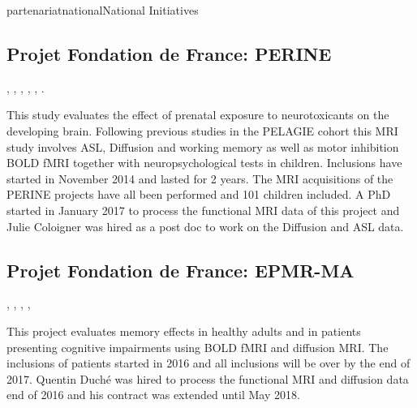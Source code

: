 \documentclass{ra2018}
\begin{document}
\begin{module}{partenariat}{national}{National Initiatives}

        \subsection{Projet Fondation de France: PERINE}
    \begin{participants}
      , 
      , 
      , 
      , 
      ,
      .
    \end{participants}
    This study evaluates the effect of prenatal exposure to neurotoxicants on the
    developing brain. Following previous studies in the PELAGIE cohort this MRI
    study involves ASL, Diffusion and working memory as well as motor inhibition
    BOLD fMRI together with neuropsychological tests in children. Inclusions have
    started in November 2014 and lasted for 2 years.  The MRI acquisitions of the
    PERINE projects have all been performed and 101 children included. A PhD started in January 2017 to process the functional MRI data of this
    project and Julie Coloigner was hired as a post doc to work on the Diffusion and ASL data.
    
    \subsection{Projet Fondation de France: EPMR-MA}
    \begin{participants}
      ,
      , 
      , 
      , 
    \end{participants}
    This project evaluates memory effects in healthy adults and in patients
    presenting cognitive impairments using BOLD fMRI and diffusion MRI. 
    The inclusions of patients started in 2016 and all inclusions will be over by the end of 2017. Quentin Duché was hired to process the functional MRI and diffusion data end of 2016 and his contract was extended until May 2018. 



\end{module}
\end{document}
